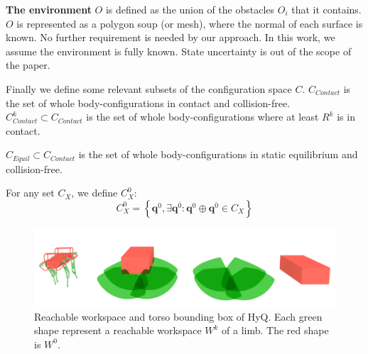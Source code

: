 \documentclass[journal]{IEEEtran}
\providecommand{\DIFaddtex}[1]{#1} %
\providecommand{\DIFaddbegin}{\protect\color{blue}} %
\providecommand{\DIFaddend}{\protect\color{black}} %
\providecommand{\DIFaddbeginFL}{} %
\providecommand{\DIFaddendFL}{} %
\providecommand{\DIFdelbeginFL}{} %
\providecommand{\DIFdelendFL}{} %
\providecommand{\DIFadd}[1]{\texorpdfstring{\DIFaddtex{#1}}{#1}} %
\begin{document}

\medskip
\textbf{The environment} $O$ is defined as the union of the obstacles $O_i$ that it contains. \DIFaddbegin \DIFadd{$O$ is represented
as a polygon soup (or mesh), where the normal of each surface is known. No further requirement is needed
by our approach. In this work, we assume the environment is fully known. State uncertainty is out of the scope of the paper.
}\DIFaddend 

\medskip
Finally we define some relevant subsets of the configuration space $C$.
$C_{Contact}$ is the set of whole body-configurations in contact and collision-free.
$C_{Contact}^k \subset C_{Contact}$ is the set of whole body-configurations where at least $R^k$ is in contact.

\medskip
$C_{Equil} \subset C_{Contact}$ is the set of whole body-configurations in static equilibrium and collision-free.

\medskip
For any set $C_{X}$, we define $C_{X}^0$:
\begin{equation*}
  C_{X}^0 = \left\{ \mathbf{q}^{0},  \exists \mathbf{q}^{\overline{0}}: \mathbf{q}^0  \oplus \mathbf{q}^{\overline{0}} \in C_{X} \right\}
\end{equation*}

\begin{figure}
  \centering
  \DIFdelbeginFL %
\DIFdelendFL \DIFaddbeginFL \includegraphics[width=1\linewidth]{figures/HyQ_roms}
  \DIFaddendFL \caption{
           Reachable workspace and torso bounding box of HyQ. Each green shape represent a reachable workspace $W^k$ of a limb. The red shape is $W^0$.}
		   \label{fig:HyQ_roms}
\end{figure}
\end{document}
